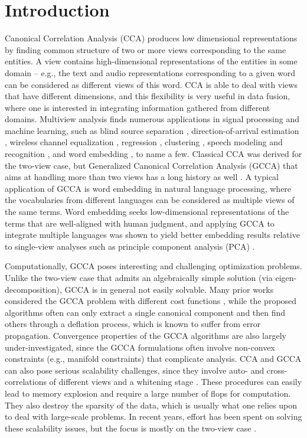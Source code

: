 \documentclass[10pt,journal]{IEEEtran}
\begin{document}
\section{Introduction}
Canonical Correlation Analysis (CCA) \cite{hardoon2004canonical} produces low dimensional representations by finding common structure of two or more views corresponding to the same entities.
A view contains high-dimensional representations of the entities in some domain -- e.g., the text and audio representations corresponding to a given word can be considered as different views of this word.
CCA is able to deal with views that have different dimensions, and this flexibility is very useful in data fusion, where one is interested in integrating information gathered from different domains.
Multiview analysis finds numerous applications in signal processing and machine learning, such as 
blind source separation \cite{li2009joint,bertrand2015distributed}, direction-of-arrival estimation \cite{wu1994music}, wireless channel equalization \cite{dogandzic2002finite}, regression \cite{kakade2007multi}, clustering \cite{chaudhuri2009multi}, speech modeling and recognition \cite{arora2014multi,wang2015acoustic}, and word embedding \cite{rastogimultiview}, to name a few.
Classical CCA was derived for the two-view case, but Generalized Canonical Correlation Analysis (GCCA) that aims at handling more than two views has a long history as well \cite{carroll1968generalization}.
A typical application of GCCA is word embedding in natural language processing, where the vocabularies from different languages can be considered as multiple views of the same terms.
Word embedding seeks low-dimensional representations of the terms that are well-aligned with human judgment, and applying GCCA to integrate multiple languages was shown to yield better embedding results relative to single-view analyses such as principle component analysis (PCA) \cite{rastogimultiview}.

Computationally, GCCA poses interesting and challenging optimization problems.
Unlike the two-view case that admits an algebraically simple solution (via eigen-decomposition),
GCCA is in general not easily solvable.
Many prior works considered the GCCA problem with different cost functions \cite{carroll1968generalization,kettenring1971canonical}, while the proposed algorithms often can only extract a single canonical component and then find others through a deflation process, which is known to suffer from error propagation.
Convergence properties of the GCCA algorithms are also largely under-investigated, since
the GCCA formulations often involve non-convex constraints (e.g., manifold constraints) that complicate analysis.
CCA and GCCA can also pose serious scalability challenges,
since they involve auto- and cross-correlations of different views and a whitening stage \cite{ma2015finding}.
These procedures can easily lead to memory explosion and require a large number of flops for computation.
They also destroy the sparsity of the data, which is usually what one relies upon to deal with large-scale problems.
In recent years, effort has been spent on solving these scalability issues, but the focus is mostly on the two-view case \cite{ma2015finding,sun2011canonical,lu2014large}.
\end{document}
